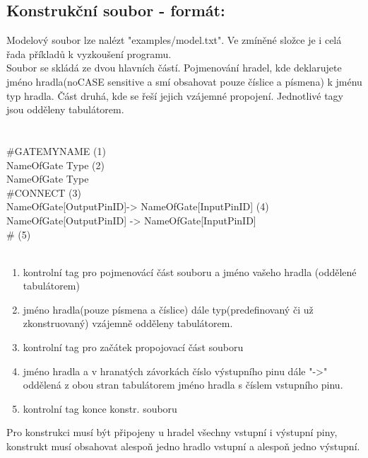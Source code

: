 \documentclass[12pt, oneside]{article}
\newcommand\tab[1][1cm]{\hspace*{#1}}
\begin{document}
\subsection*{Konstrukční soubor - formát:}
Modelový soubor lze nalézt "examples/model.txt".  Ve zmíněné složce je i celá řada příkladů k vyzkoušení programu. \\
Soubor se skládá ze dvou hlavních částí. Pojmenování hradel, kde deklarujete jméno hradla(noCASE sensitive a smí obsahovat pouze číslice a písmena) k jménu typ hradla. Část druhá, kde se řeší jejich vzájemné propojení. Jednotlivé tagy jsou odděleny tabulátorem. \\
\\ \\
\#GATE\tab MYNAME (1) \\
NameOfGate \tab Type (2)\\
NameOfGate	\tab Type \\
\#CONNECT (3) \\
NameOfGate[OutputPinID]\tab	-> \tab	NameOfGate[InputPinID] (4) \\
NameOfGate[OutputPinID]	 \tab -> \tab	NameOfGate[InputPinID] \\
\# (5) 
\\ \\ 
\begin{enumerate} 
\item kontrolní tag pro pojmenovácí část souboru a jméno vašeho hradla (oddělené tabulátorem)
\item jméno hradla(pouze písmena a číslice) dále typ(predefinovaný či už zkonstruovaný) vzájemně odděleny tabulátorem. 
\item  kontrolní tag pro začátek propojovací část souboru
\item  jméno hradla a v hranatých závorkách číslo výstupního pinu dále "->" oddělená z obou stran tabulátorem jméno hradla s číslem vstupního pinu. 
\item kontrolní tag konce konstr. souboru
\end{enumerate} 
Pro konstrukci musí být připojeny u hradel všechny vstupní i výstupní piny, konstrukt musí obsahovat alespoň jedno hradlo vstupní a alespoň jedno výstupní. 
\end{document}
